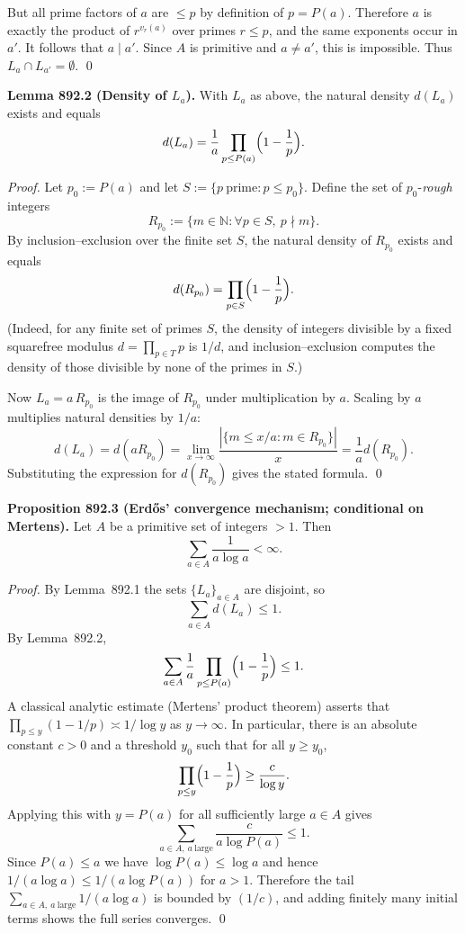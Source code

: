 But all prime factors of $a$ are $\le p$ by definition of $p=P(a)$.
Therefore $a$ is exactly the product of $r^{v_r(a)}$ over primes $r\le p$, and the
same exponents occur in $a'$. It follows that $a\mid a'$.
Since $A$ is primitive and $a\ne a'$, this is impossible.
Thus $L_a\cap L_{a'}=\emptyset$.
\qed

\medskip
\noindent\textbf{Lemma 892.2 (Density of $L_a$).}
With $L_a$ as above, the natural density $d(L_a)$ exists and equals
\[
 d(L_a)=\frac{1}{a}\prod_{p\le P(a)}\Bigl(1-\frac{1}{p}\Bigr).
\]

\emph{Proof.}
Let $p_0:=P(a)$ and let $S:=\{p\ \text{prime}: p\le p_0\}$.
Define the set of $p_0$-\emph{rough} integers
\[
R_{p_0}:=\{m\in\mathbb{N}: \forall p\in S,\ p\nmid m\}.
\]
By inclusion--exclusion over the finite set $S$, the natural density of $R_{p_0}$
exists and equals
\[
 d(R_{p_0})=\prod_{p\in S}\Bigl(1-\frac{1}{p}\Bigr).
\]
(Indeed, for any finite set of primes $S$, the density of integers divisible by a
fixed squarefree modulus $d=\prod_{p\in T}p$ is $1/d$, and inclusion--exclusion
computes the density of those divisible by none of the primes in $S$.)

Now $L_a = a\,R_{p_0}$ is the image of $R_{p_0}$ under multiplication by $a$.
Scaling by $a$ multiplies natural densities by $1/a$:
\[
 d(L_a)=d(aR_{p_0})=\lim_{x\to\infty}\frac{|\{m\le x/a: m\in R_{p_0}\}|}{x}
      =\frac{1}{a} d(R_{p_0}).
\]
Substituting the expression for $d(R_{p_0})$ gives the stated formula.
\qed

\medskip
\noindent\textbf{Proposition 892.3 (Erd\H{o}s’ convergence mechanism; conditional on Mertens).}
Let $A$ be a primitive set of integers $>1$. Then
\[
\sum_{a\in A} \frac{1}{a\log a}<\infty.
\]

\emph{Proof.}
By Lemma~892.1 the sets $\{L_a\}_{a\in A}$ are disjoint, so
\[ \sum_{a\in A} d(L_a) \le 1. \]
By Lemma~892.2,
\[ \sum_{a\in A} \frac{1}{a}\prod_{p\le P(a)}\Bigl(1-\frac{1}{p}\Bigr) \le 1.
\]
A classical analytic estimate (Mertens’ product theorem) asserts that
\(\prod_{p\le y}(1-1/p) \asymp 1/\log y\) as $y\to\infty$.
In particular, there is an absolute constant $c>0$ and a threshold $y_0$ such that
for all $y\ge y_0$,
\[
\prod_{p\le y}\Bigl(1-\frac{1}{p}\Bigr) \ge \frac{c}{\log y}.
\]
Applying this with $y=P(a)$ for all sufficiently large $a\in A$ gives
\[
\sum_{a\in A,\ a\ \text{large}} \frac{c}{a\log P(a)} \le 1.
\]
Since $P(a)\le a$ we have $\log P(a)\le \log a$ and hence
$1/(a\log a)\le 1/(a\log P(a))$ for $a>1$. Therefore the tail
$\sum_{a\in A,\ a\ \text{large}} 1/(a\log a)$ is bounded by $(1/c)$, and adding
finitely many initial terms shows the full series converges.
\qed

